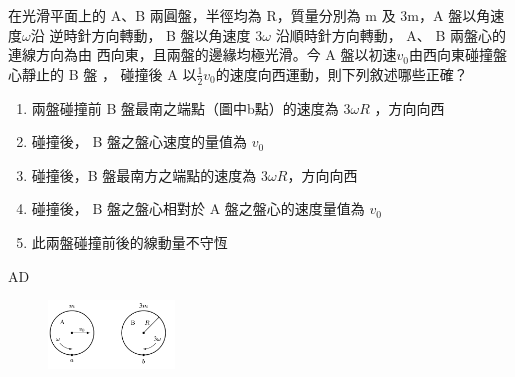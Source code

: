 \documentclass[cn,10pt,math=newtx,chinesefont=founder]{elegantbook}
\begin{document}
\begin{example}
    在光滑平面上的 A、B 兩圓盤，半徑均為 R，質量分別為 m 及 3m，A 盤以角速度$\omega$沿
    逆時針方向轉動， B 盤以角速度 $3\omega$ 沿順時針方向轉動， A、 B 兩盤心的連線方向為由
    西向東，且兩盤的邊緣均極光滑。今 A 盤以初速$v_0$由西向東碰撞盤心靜止的 B 盤 ，
    碰撞後 A 以$\frac{1}{2} v_0$的速度向西運動，則下列敘述哪些正確？
    \begin{enumerate}[label=(\Alph*)]
        \item 兩盤碰撞前 B 盤最南之端點（圖中b點）的速度為 $3\omega R$ ，方向向西
        \item 碰撞後， B 盤之盤心速度的量值為 $v_0$
        \item 碰撞後，B 盤最南方之端點的速度為 $3\omega R$，方向向西
        \item 碰撞後， B 盤之盤心相對於 A 盤之盤心的速度量值為 $v_0$
        \item 此兩盤碰撞前後的線動量不守恆
    \end{enumerate}
    \rightline{[92指考]}
\end{example}
\begin{solution}
    AD
\end{solution}
\begin{figure}[htbp]
    \flushright
    \includegraphics[width=0.3\textwidth]{image/92_14.png}
\end{figure}
\newpage
\end{document}
